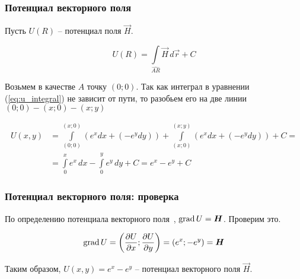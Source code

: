 \begin{frame}\frametitle{Потенциал векторного поля}
	Пусть \(U(R)\) -- потенциал поля \(\vec H\).

	\begin{equation*}
		U(R) =
		\int\limits_{\widehat{AR}} \vec H \, d \vec r + C
		\label{eq:u_integral}
	\end{equation*}

	Возьмем в качестве $A$ точку $(0; 0)$.
	Так как интеграл в уравнении (\ref{eq:u_integral}) не зависит от пути,
	то разобьем его на две линии $(0; 0) - (x; 0) - (x; y)$

	\begin{align*}
		U(x, y) & = \int\limits_{(0; 0)}^{(x; 0)} \left(e^x dx + (-e^y dy) \right) +
		\int\limits_{(x; 0)}^{(x; y)} \left(e^x dx + (-e^y dy) \right) + C =         \\
		        & =
		\int\limits_{0}^{x} e^x \, dx - \int\limits_{0}^{y} e^y \, dy + C =
		e^{x} - e^{y} + C
	\end{align*}

\end{frame}

\begin{frame}\frametitle{Потенциал векторного поля: проверка}
	По определению потенциала векторного поля~\cite[ст.~269]{zorich}, $\grad U = \vec H$. Проверим это.

	\begin{equation*}
		\grad U =
		\left( \frac{\partial U}{\partial x}; \frac{\partial U}{\partial y} \right) =
		\left( e^x; -e^y \right)
		= \vec H
	\end{equation*}

	Таким образом, \(U(x,y) = e^{x} - e^{y}\) -- потенциал векторного поля \(\vec H\).
\end{frame}
